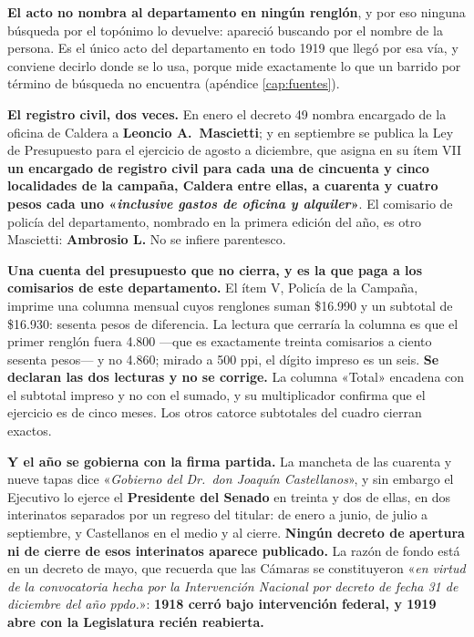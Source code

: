 \begin{cautela}
\textbf{El acto no nombra al departamento en ningún renglón}, y por eso ninguna búsqueda por el
topónimo lo devuelve: apareció buscando por el nombre de la persona. Es el único acto del
departamento en todo 1919 que llegó por esa vía, y conviene decirlo donde se lo usa, porque mide
exactamente lo que un barrido por término de búsqueda no encuentra (apéndice
\ref{cap:fuentes}).
\end{cautela}

\textbf{El registro civil, dos veces.} En enero el decreto 49 nombra encargado de la oficina de
Caldera a \textbf{Leoncio A.\ Mascietti}; y en septiembre se publica la Ley de Presupuesto
para el ejercicio de agosto a diciembre, que asigna en su ítem VII \textbf{un encargado de registro civil para cada una de
cincuenta y cinco localidades de la campaña, Caldera entre ellas, a cuarenta y cuatro pesos cada
uno «\textit{inclusive gastos de oficina y alquiler}»}. El comisario de policía del departamento,
nombrado en la primera edición del año, es otro Mascietti: \textbf{Ambrosio L.} No se infiere
parentesco.

\begin{cautela}
\textbf{Una cuenta del presupuesto que no cierra, y es la que paga a los comisarios de este
departamento.} El ítem V, Policía de la Campaña, imprime una columna mensual cuyos renglones suman
\$16.990 y un subtotal de \$16.930: sesenta pesos de diferencia. La lectura que cerraría la
columna es que el primer renglón fuera 4.800 ---que es exactamente treinta comisarios a ciento
sesenta pesos--- y no 4.860; mirado a 500 ppi, el dígito impreso es un seis. \textbf{Se declaran
las dos lecturas y no se corrige.} La columna «Total» encadena con el subtotal impreso y no con el
sumado, y su multiplicador confirma que el ejercicio es de cinco meses. Los otros catorce
subtotales del cuadro cierran exactos.
\end{cautela}

\textbf{Y el año se gobierna con la firma partida.} La mancheta de las cuarenta y nueve tapas dice
«\textit{Gobierno del Dr.\ don Joaquín Castellanos}», y sin embargo el Ejecutivo lo ejerce el
\textbf{Presidente del Senado} en treinta y dos de ellas, en dos interinatos separados por un
regreso del titular: de enero a junio, de julio a septiembre, y Castellanos en el medio y al
cierre. \textbf{Ningún decreto de apertura ni de cierre de esos interinatos aparece publicado.} La
razón de fondo está en un decreto de mayo, que recuerda que las Cámaras se constituyeron
«\textit{en virtud de la convocatoria hecha por la Intervención Nacional por decreto de fecha 31
de diciembre del año ppdo.}»: \textbf{1918 cerró bajo intervención federal, y 1919 abre con la
Legislatura recién reabierta.}


